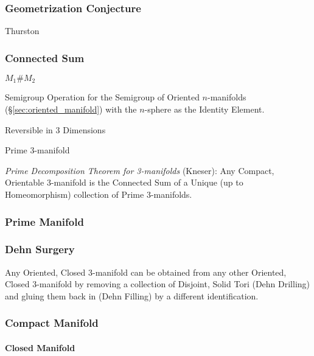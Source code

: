 \subsubsection{Geometrization Conjecture}
\label{sec:geometrization_conjecture}

Thurston



\subsubsection{Connected Sum}\label{sec:connected_sum}

$M_1 \# M_2$

Semigroup Operation for the Semigroup of Oriented $n$-manifolds
(\S\ref{sec:oriented_manifold}) with the $n$-sphere as the Identity Element.

Reversible in 3 Dimensions

Prime 3-manifold

\emph{Prime Decomposition Theorem for 3-manifolds} (Kneser): Any Compact,
Orientable 3-manifold is the Connected Sum of a Unique (up to Homeomorphism)
collection of Prime 3-manifolds.



\subsubsection{Prime Manifold}\label{sec:prime_manifold}

\subsubsection{Dehn Surgery}\label{sec:dehn_surgery}

Any Oriented, Closed 3-manifold can be obtained from any other
Oriented, Closed 3-manifold by removing a collection of Disjoint,
Solid Tori (Dehn Drilling) and gluing them back in (Dehn Filling) by a
different identification.



\subsubsection{Compact Manifold}\label{sec:compact_manifold}

\paragraph{Closed Manifold}\label{sec:closed_manifold}\hfill

